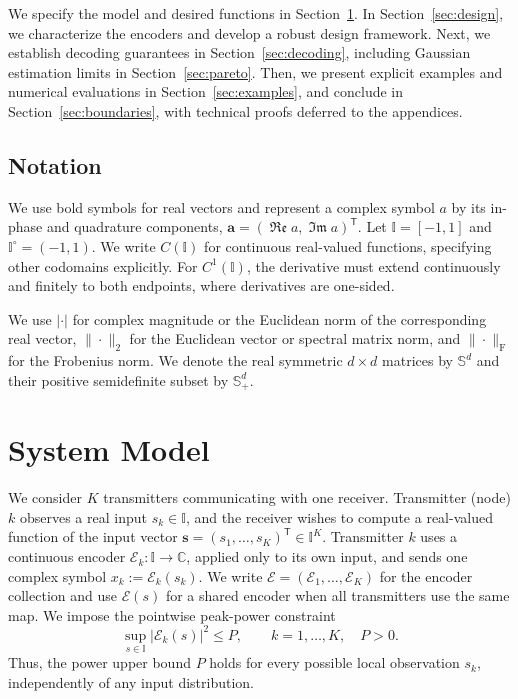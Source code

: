 \documentclass[journal,12pt,onecolumn,draftclsnofoot]{IEEEtran}
\newcommand{\enc}{\mathscr{E}}\newcommand{\dec}{\mathscr{D}}\newcommand{\R}{\mathbb R}\newcommand{\C}{\mathbb C}
\newcommand{\T}{\mathsf T}\newcommand{\suc}{\succeq}
\renewcommand{\Re}{\mathop{\mathfrak{Re}}\nolimits}
\renewcommand{\Im}{\mathop{\mathfrak{Im}}\nolimits}
\begin{document}
We specify the model and desired functions in Section~\ref{sec:model}. In Section~\ref{sec:design}, we characterize the encoders and develop a robust design framework. Next, we establish decoding guarantees in Section~\ref{sec:decoding}, including Gaussian estimation limits in Section~\ref{sec:pareto}. Then, we present explicit examples and numerical evaluations in Section~\ref{sec:examples}, and conclude in Section~\ref{sec:boundaries}, with technical proofs deferred to the appendices.





\subsection{Notation}\label{sec:notation}


We use bold symbols for real vectors and represent a complex symbol $a$ by its in-phase and quadrature components, $\boldsymbol a=(\Re a,\Im a)^\T$. Let $\mathbb I=[-1,1]$ and $\mathbb I^\circ=(-1,1)$. We write $C(\mathbb I)$ for continuous real-valued functions, specifying other codomains explicitly. For $C^1(\mathbb I)$, the derivative must extend continuously and finitely to both endpoints, where derivatives are one-sided.

We use $|\cdot|$ for complex magnitude or the Euclidean norm of the corresponding real vector, $\|\cdot\|_2$ for the Euclidean vector or spectral matrix norm, and $\|\cdot\|_{\mathrm F}$ for the Frobenius norm. We denote the real symmetric $d\times d$ matrices by $\mathbb S^d$ and their positive semidefinite subset by $\mathbb S^d_+$.


\section{System Model}\label{sec:model}


We consider $K$ transmitters communicating with one receiver. Transmitter (node) $k$ observes a real input $s_k\in\mathbb I$, and the receiver wishes to compute a real-valued function of the input vector $\boldsymbol s=(s_1,\ldots,s_K)^\T\in\mathbb I^K$. Transmitter $k$ uses a continuous encoder $\enc_k:\mathbb I\to\C$, applied only to its own input, and sends one complex symbol $x_k:=\enc_k(s_k)$. We write $\enc=(\enc_1,\ldots,\enc_K)$ for the encoder collection and use $\enc(s)$ for a shared encoder when all transmitters use the same map.  We impose the pointwise peak-power constraint
\begin{equation}
  \sup_{s\in\mathbb I}|\enc_k(s)|^2\le P,\qquad k=1,\ldots,K,\quad P>0.
 \label{eq:peak-model}
\end{equation}
Thus, the power upper bound $P$ holds for every possible local observation $s_k$, independently of any input distribution.
\end{document}
